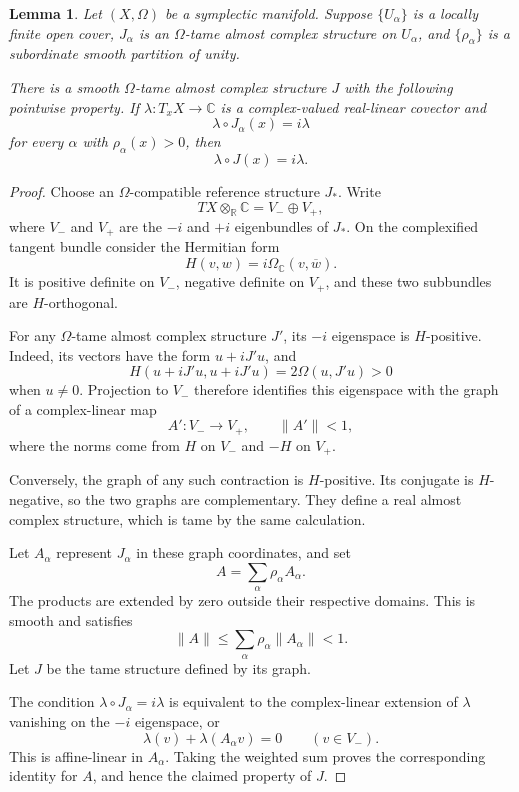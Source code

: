 \documentclass[11pt]{article}
\newtheorem{lemma}[theorem]{Lemma}
\theoremstyle{definition}
\theoremstyle{remark}
\newcommand{\R}{\mathbb R}
\newcommand{\C}{\mathbb C}
\begin{document}
\begin{lemma}\label{lem:tame-gluing}
Let $(X,\Omega)$ be a symplectic manifold.  Suppose $\{U_\alpha\}$
is a locally finite open cover, $J_\alpha$ is an $\Omega$-tame
almost complex structure on $U_\alpha$, and $\{\rho_\alpha\}$
is a subordinate smooth partition of unity.

There is a smooth $\Omega$-tame almost complex structure $J$
with the following pointwise property.  If
$\lambda:T_xX\to\C$ is a complex-valued real-linear covector and
\[
\lambda\circ J_\alpha(x)=i\lambda
\]
for every $\alpha$ with $\rho_\alpha(x)>0$, then
\[
\lambda\circ J(x)=i\lambda.
\]
\end{lemma}

\begin{proof}
Choose an $\Omega$-compatible reference structure $J_*$.
Write
\[
TX\otimes_{\R}\C=V_-\oplus V_+,
\]
where $V_-$ and $V_+$ are the $-i$ and $+i$ eigenbundles of
$J_*$.  On the complexified tangent bundle consider the
Hermitian form
\[
H(v,w)=i\Omega_{\C}(v,\overline w).
\]
It is positive definite on $V_-$, negative definite on $V_+$,
and these two subbundles are $H$-orthogonal.

For any $\Omega$-tame almost complex structure $J'$, its
$-i$ eigenspace is $H$-positive.  Indeed, its vectors have the
form $u+iJ'u$, and
\[
H(u+iJ'u,u+iJ'u)=2\Omega(u,J'u)>0
\]
when $u\neq0$.  Projection to $V_-$ therefore identifies this
eigenspace with the graph of a complex-linear map
\[
A':V_-\longrightarrow V_+,\qquad \|A'\|<1,
\]
where the norms come from $H$ on $V_-$ and $-H$ on $V_+$.

Conversely, the graph of any such contraction is $H$-positive.
Its conjugate is $H$-negative, so the two graphs are
complementary.  They define a real almost complex structure,
which is tame by the same calculation.

Let $A_\alpha$ represent $J_\alpha$ in these graph coordinates,
and set
\[
A=\sum_\alpha\rho_\alpha A_\alpha.
\]
The products are extended by zero outside their respective
domains.  This is smooth and satisfies
\[
\|A\|\leq\sum_\alpha\rho_\alpha\|A_\alpha\|<1.
\]
Let $J$ be the tame structure defined by its graph.

The condition $\lambda\circ J_\alpha=i\lambda$ is equivalent
to the complex-linear extension of $\lambda$ vanishing on the
$-i$ eigenspace, or
\[
\lambda(v)+\lambda(A_\alpha v)=0
\qquad(v\in V_-).
\]
This is affine-linear in $A_\alpha$.  Taking the weighted sum
proves the corresponding identity for $A$, and hence the
claimed property of $J$.
\end{proof}
\end{document}

